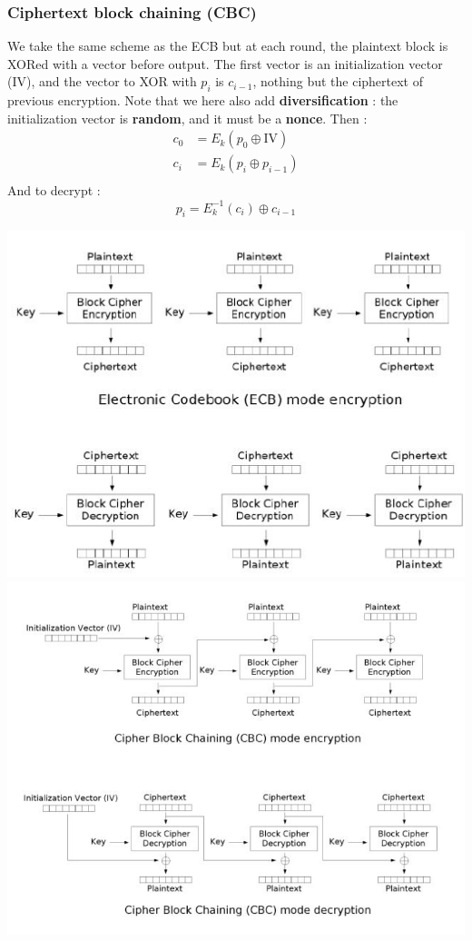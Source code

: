 \documentclass[../Cryptography.tex]{subfiles}
\begin{document}
\subsubsection{Ciphertext block chaining (CBC)}
We take the same scheme as the ECB but at each round, the plaintext block is XORed with a vector before output. The first vector is an initialization vector (IV), and the vector to XOR with $p_i$ is $c_{i-1}$, nothing but the ciphertext of previous encryption. Note that we here also add \textbf{diversification} : the initialization vector is \textbf{random}, and it must be a \textbf{nonce}. Then :
$$\begin{array}{ll}
    c_0 &= E_k(p_0 \oplus \mathrm{IV}) \\
    c_i &= E_k(p_i \oplus p_{i-1}) \\
\end{array}$$
And to decrypt : 
$$p_i = E_k ^{-1}(c_i) \oplus c_{i-1}$$

\begin{center}
    \includegraphics[width=0.45\linewidth]{images/2-EBC.png}
    \includegraphics[width=0.45\linewidth]{images/2-CBC.png}
\end{center}
\end{document}
